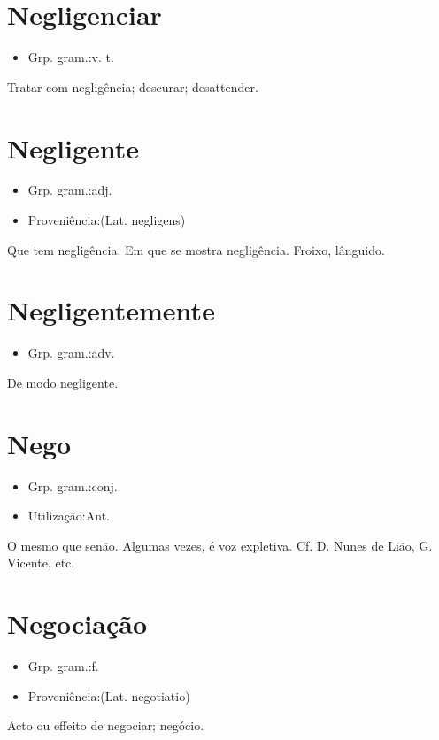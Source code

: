 \section{Negligenciar}
\begin{itemize}
\item {Grp. gram.:v. t.}
\end{itemize}
Tratar com negligência; descurar; desattender.
\section{Negligente}
\begin{itemize}
\item {Grp. gram.:adj.}
\end{itemize}
\begin{itemize}
\item {Proveniência:(Lat. \textunderscore negligens\textunderscore )}
\end{itemize}
Que tem negligência.
Em que se mostra negligência.
Froixo, lânguido.
\section{Negligentemente}
\begin{itemize}
\item {Grp. gram.:adv.}
\end{itemize}
De modo negligente.
\section{Nego}
\begin{itemize}
\item {Grp. gram.:conj.}
\end{itemize}
\begin{itemize}
\item {Utilização:Ant.}
\end{itemize}
O mesmo que \textunderscore senão\textunderscore .
Algumas vezes, é voz expletiva. Cf. \textunderscore D. Nunes de Lião\textunderscore , G. Vicente, etc.
\section{Negociação}
\begin{itemize}
\item {Grp. gram.:f.}
\end{itemize}
\begin{itemize}
\item {Proveniência:(Lat. \textunderscore negotiatio\textunderscore )}
\end{itemize}
Acto ou effeito de negociar; negócio.
